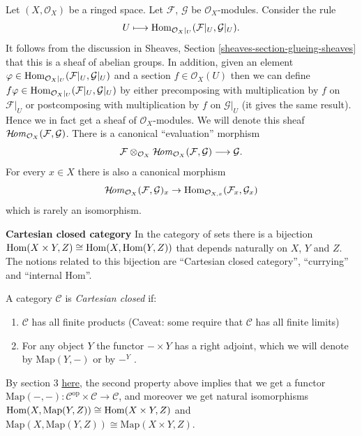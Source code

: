 Let $(X, \mathcal{O}_X)$ be a ringed space.
Let $\mathcal{F}$, $\mathcal{G}$ be
$\mathcal{O}_X$-modules.
Consider the rule
$$
U \longmapsto
\mathop{\mathrm{Hom}}\nolimits_{\mathcal{O}_X|_U}(\mathcal{F}|_U,
\mathcal{G}|_U).
$$
It follows from the discussion in Sheaves,
Section
\ref{sheaves-section-glueing-sheaves} that
this is a sheaf of
abelian groups. In addition, given an element
$\varphi \in
\mathop{\mathrm{Hom}}\nolimits_{\mathcal{O}_X|_U}(\mathcal{F}|_U,
\mathcal{G}|_U)$
and a section $f \in \mathcal{O}_X(U)$ then
we can define
$f\varphi \in
\mathop{\mathrm{Hom}}\nolimits_{\mathcal{O}_X|_U}(\mathcal{F}|_U,
\mathcal{G}|_U)$
by either precomposing with multiplication by
$f$ on $\mathcal{F}|_U$
or postcomposing with multiplication by $f$
on $\mathcal{G}|_U$ (it gives
the same result). Hence we in fact get a
sheaf of $\mathcal{O}_X$-modules.
We will denote this sheaf
$\mathop{\mathcal{H}\!\mathit{om}}\nolimits_{\mathcal{O}_X}(\mathcal{F},
\mathcal{G})$.
There is a canonical ``evaluation'' morphism
$$
\mathcal{F}
\otimes_{\mathcal{O}_X}
\mathop{\mathcal{H}\!\mathit{om}}\nolimits_{\mathcal{O}_X}(\mathcal{F},
\mathcal{G})
\longrightarrow
\mathcal{G}.
$$
For every $x \in X$ there is also a canonical
morphism
$$
\mathop{\mathcal{H}\!\mathit{om}}\nolimits_{\mathcal{O}_X}(\mathcal{F},
\mathcal{G})_x
\to
\mathop{\mathrm{Hom}}\nolimits_{\mathcal{O}_{X, x}}(\mathcal{F}_x,
\mathcal{G}_x)
$$
which is rarely an isomorphism.

\medskip\noindent
{\bf Cartesian closed category} In the
category of sets there is a bijection
$\mathop{\mathrm{Hom}}\nolimits(X\times Y, Z)\cong \mathop{\mathrm{Hom}}\nolimits(X,
\text{Hom}(Y, Z))$ that depends
naturally on $X$, $Y$ and $Z$. The notions
related to this bijection are
“Cartesian closed category”, “currying” and
“internal Hom”.

\begin{definition}
\label{definition-Cartesian-closed-category}
A category $\mathcal{C}$ is {\it Cartesian
closed} if:
\begin{enumerate}
\item $\mathcal{C}$ has all finite products
(Caveat: some require that $\mathcal{C}$ has
all finite limits)
\item For any object $Y$ the functor $-
\times Y$ has a right adjoint,
which we will denote by $\text{Map}(Y,-)$ or
by $-^Y$ .
\end{enumerate}
\end{definition}

\begin{remark}
\label{remark-currying}
By section 3
\href{https://ncatlab.org/nlab/show/internal%
+hom
}{here}, the
second property above implies that we get a
functor
$\text{Map}(-,-) :\mathcal{C}^{\text{op}}
\times \mathcal{C} \to \mathcal{C}$,
and moreover we get natural isomorphisms
$\mathop{\mathrm{Hom}}\nolimits(X, \text{Map}(Y, Z)) \cong \mathop{\mathrm{Hom}}\nolimits(X
\times Y, Z)$
and $\text{Map}(X, \text{Map}(Y, Z))\cong
\text{Map}(X \times Y, Z)$.
\end{remark}

